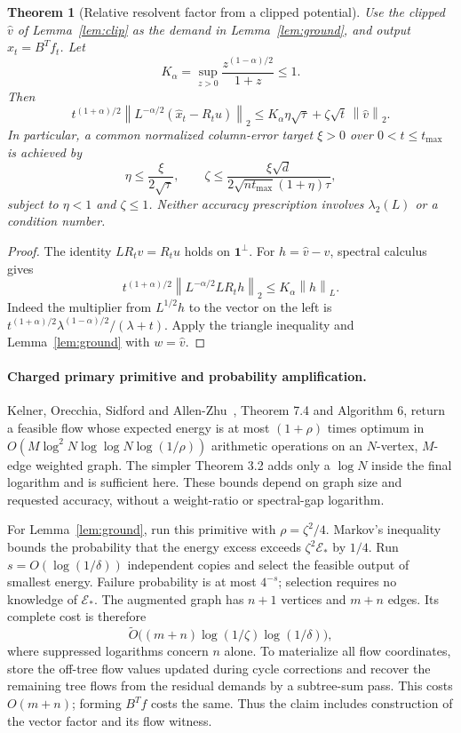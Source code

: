 \documentclass[11pt]{article}
\newtheorem{theorem}[lemma]{Theorem}
\newcommand{\norm}[1]{\left\lVert #1\right\rVert}
\begin{document}
\begin{theorem}[Relative resolvent factor from a clipped potential]
\label{thm:factor}
Use the clipped $\widehat v$ of Lemma~\ref{lem:clip} as the demand in
Lemma~\ref{lem:ground}, and output $\widehat x_t=B^Tf_t$. Let
\[
 K_\alpha=\sup_{z>0}\frac{z^{(1-\alpha)/2}}{1+z}\le1.
\]
Then
\[
 t^{(1+\alpha)/2}
 \norm{L^{-\alpha/2}(\widehat x_t-R_tu)}_2
 \le K_\alpha\eta\sqrt\tau
             +\zeta\sqrt t\,\norm{\widehat v}_2.
\]
In particular, a common normalized column-error target $\xi>0$
over $0<t\le t_{\max}$ is achieved by
\[
 \eta\le\frac{\xi}{2\sqrt\tau},\qquad
 \zeta\le\frac{\xi\sqrt d}
 {2\sqrt{nt_{\max}}(1+\eta)\tau},
\]
subject to $\eta<1$ and $\zeta\le1$. Neither accuracy prescription
involves $\lambda_2(L)$ or a condition number.
\end{theorem}
\begin{proof}
The identity $LR_tv=R_tu$ holds on $\mathbf1^\perp$.
For $h=\widehat v-v$, spectral calculus gives
\[
 t^{(1+\alpha)/2}
 \norm{L^{-\alpha/2}LR_th}_2
 \le K_\alpha\norm h_L.
\]
Indeed the multiplier from $L^{1/2}h$ to the vector on the left is
$t^{(1+\alpha)/2}\lambda^{(1-\alpha)/2}/(\lambda+t)$.
Apply the triangle inequality and Lemma~\ref{lem:ground} with
$w=\widehat v$.
\end{proof}

\paragraph{Charged primary primitive and probability amplification.}
Kelner, Orecchia, Sidford and Allen-Zhu~\cite{KOSZ}, Theorem 7.4 and
Algorithm 6, return a feasible flow whose expected energy is at most
$(1+\rho)$ times optimum in
$O(M\log^2N\log\log N\log(1/\rho))$ arithmetic operations on an
$N$-vertex, $M$-edge weighted graph. The simpler Theorem 3.2 adds
only a $\log N$ inside the final logarithm and is sufficient here.
These bounds depend on graph size and requested accuracy, without a
weight-ratio or spectral-gap logarithm.

For Lemma~\ref{lem:ground}, run this primitive with
$\rho=\zeta^2/4$. Markov's inequality bounds the probability that
the energy excess exceeds $\zeta^2\mathcal E_*$ by $1/4$.
Run $s=O(\log(1/\delta))$ independent copies and select the feasible
output of smallest energy. Failure probability is at most $4^{-s}$;
selection requires no knowledge of $\mathcal E_*$. The augmented graph
has $n+1$ vertices and $m+n$ edges. Its complete cost is therefore
\[
 \widetilde O\bigl((m+n)\log(1/\zeta)\log(1/\delta)\bigr),
\]
where suppressed logarithms concern $n$ alone. To materialize all flow
coordinates, store the off-tree flow values updated during cycle
corrections and recover the remaining tree flows from the residual
demands by a subtree-sum pass. This costs $O(m+n)$; forming $B^Tf$
costs the same. Thus the claim includes construction of the vector
factor and its flow witness.
\end{document}
